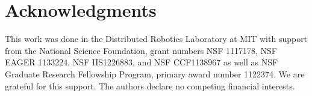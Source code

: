 \section*{Acknowledgments}
\label{sec:Acknowledgments}
This work was done in the Distributed Robotics Laboratory at MIT with support from the National Science Foundation, grant numbers NSF 1117178, NSF EAGER 1133224, NSF IIS1226883, and NSF CCF1138967 as well as NSF Graduate Research Fellowship Program, primary award number 1122374. We are grateful for this support. The authors declare no competing financial interests. 

